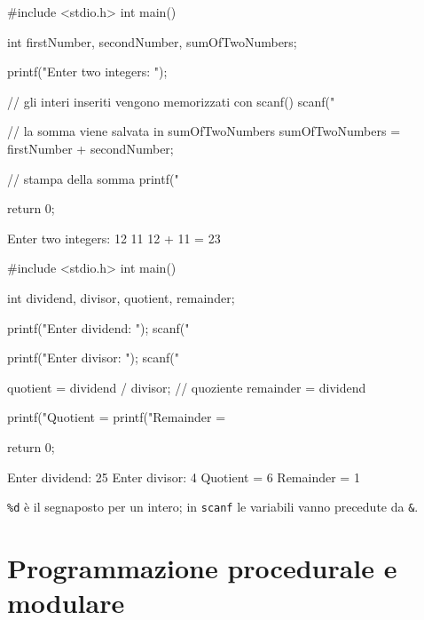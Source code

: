 \documentclass[11pt,a4paper]{article}
\begin{document}
\begin{esempio}
\begin{codice}
#include <stdio.h>
int main() {
    int firstNumber, secondNumber, sumOfTwoNumbers;

    printf("Enter two integers: ");

    // gli interi inseriti vengono memorizzati con scanf()
    scanf("%

    // la somma viene salvata in sumOfTwoNumbers
    sumOfTwoNumbers = firstNumber + secondNumber;

    // stampa della somma
    printf("%

    return 0;
}
\end{codice}
\begin{risultato}
Enter two integers: 12
11
12 + 11 = 23
\end{risultato}
\end{esempio}

\begin{esempio}
\begin{codice}
#include <stdio.h>
int main() {
    int dividend, divisor, quotient, remainder;

    printf("Enter dividend: ");
    scanf("%

    printf("Enter divisor: ");
    scanf("%

    quotient = dividend / divisor;    // quoziente
    remainder = dividend %

    printf("Quotient = %
    printf("Remainder = %

    return 0;
}
\end{codice}
\begin{risultato}
Enter dividend: 25
Enter divisor: 4
Quotient = 6
Remainder = 1
\end{risultato}
\end{esempio}

\begin{osservazione}
\lstinline|%d| è il segnaposto per un intero; in \lstinline|scanf| le variabili
vanno precedute da \lstinline|&|.
\end{osservazione}

\section{Programmazione procedurale e modulare}
\end{document}
